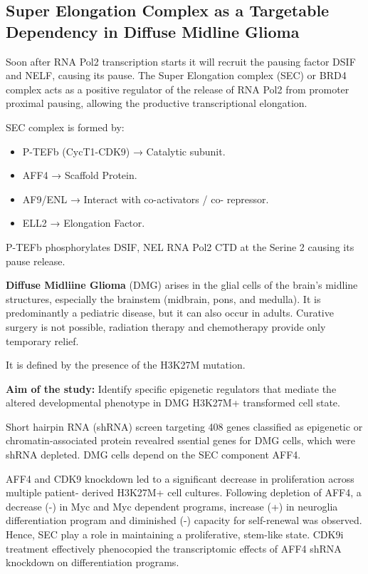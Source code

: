\subsection{Super Elongation Complex as a Targetable Dependency in Diffuse Midline Glioma}
Soon after RNA Pol2 transcription starts it will recruit the
pausing factor DSIF and NELF, causing its pause.
The Super Elongation complex (SEC) or BRD4 complex acts as
a positive regulator of the release of RNA Pol2 from
promoter proximal pausing, allowing the productive
transcriptional elongation.

SEC complex is formed by:
\begin{itemize}
\item P-TEFb (CycT1-CDK9) → Catalytic subunit.
\item AFF4 → Scaffold Protein.
\item AF9/ENL → Interact with co-activators / co-
repressor.
\item ELL2 → Elongation Factor.
\end{itemize}

P-TEFb phosphorylates DSIF, NEL RNA Pol2 CTD at the Serine 2 causing its pause release.

\textbf{Diffuse Midliine Glioma} (DMG) arises in the glial cells of the brain’s midline
structures, especially the brainstem (midbrain,
pons, and medulla).  It is predominantly a pediatric disease, but it can
also occur in adults.
Curative surgery is not possible, radiation therapy
and chemotherapy provide only temporary relief.

It is defined by the presence of the H3K27M mutation.


\textbf{Aim of the study:} Identify specific epigenetic regulators that mediate the
altered developmental phenotype in DMG H3K27M+
transformed cell state.

Short hairpin RNA (shRNA) screen targeting 408 genes classified as epigenetic or chromatin-associated
protein revealred ssential genes for DMG cells, which were shRNA depleted.  DMG cells depend on the SEC component AFF4.

AFF4 and CDK9 knockdown led to a significant
decrease in proliferation across multiple patient-
derived H3K27M+ cell cultures.
Following depletion of AFF4, a decrease (-) in Myc and Myc dependent programs, increase (+) in neuroglia differentiation program
and diminished (-) capacity for self-renewal was observed. Hence, SEC play a role in maintaining a proliferative, stem-like state. CDK9i treatment effectively phenocopied the transcriptomic effects of AFF4 shRNA knockdown on differentiation programs.

